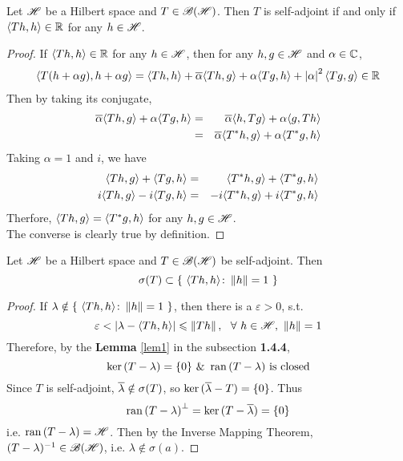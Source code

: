 \documentclass[a4paper,11pt]{report}
\begin{document}
\begin{prop}
	Let $\mathscr{H}$ be a Hilbert space and $T \in \mathscr{B(H)}$. Then $T$ is self-adjoint if and only if $\langle Th,h \rangle \in \mathbb{R}$ for any $h \in \mathscr{H}$.
\end{prop}
\begin{proof}
	If $\langle Th,h \rangle \in \mathbb{R}$ for any $h \in \mathscr{H}$, then for any $h,g \in \mathscr{H}$ and $\alpha \in \mathbb{C}$,
	\begin{eqnarray*}
		\langle T(h+\alpha g),h+\alpha g \rangle = \langle Th,h \rangle + \overline{\alpha}\langle Th,g \rangle + \alpha \langle Tg,h \rangle + \left\lvert\alpha\right\lvert^2 \langle Tg,g \rangle \in \mathbb{R}
	\end{eqnarray*}
	Then by taking its conjugate,
	\begin{eqnarray*}
		\overline{\alpha}\langle Th,g \rangle + \alpha \langle Tg,h \rangle &=& \overline{\alpha} \langle h,Tg \rangle + \alpha \langle g,Th \rangle \\
		&=& \overline{\alpha} \langle T^{*}h,g \rangle + \alpha \langle T^{*}g,h \rangle
	\end{eqnarray*}
	Taking $\alpha = 1$ and $i$, we have
	\begin{eqnarray*}
		\langle Th,g \rangle + \langle Tg,h \rangle &=& \langle T^{*}h,g \rangle + \langle T^{*}g,h \rangle \\
		i\langle Th,g \rangle - i\langle Tg,h \rangle &=& -i\langle T^{*}h,g \rangle + i\langle T^{*}g,h \rangle
	\end{eqnarray*}
	Therfore, $\langle Th,g \rangle=\langle T^{*}g,h \rangle$ for any $h,g \in \mathscr{H}$.\\
	The converse is clearly true by definition.
\end{proof}

\begin{prop} \label{prop9}
	Let $\mathscr{H}$ be a Hilbert space and $T \in \mathscr{B(H)}$ be self-adjoint. Then
	\begin{equation*}
		\sigma(T) \subset \{~\langle Th,h \rangle \colon \left\lVert h\right\lVert = 1~\}
	\end{equation*}
\end{prop}
\begin{proof}
	If $\lambda \notin \{~\langle Th,h \rangle \colon \left\lVert h\right\lVert = 1~\}$, then there is a $\varepsilon > 0$, s.t.
	\begin{equation*}
		\varepsilon < \left\lvert\lambda - \langle Th,h \rangle\right\lvert \leqslant \left\lVert Th\right\lVert,~~\forall~ h \in \mathscr{H},~\left\lVert h\right\lVert=1
	\end{equation*}
	Therefore, by the \textbf{Lemma} \ref{lem1} in the subsection \textbf{1.4.4},
	\begin{equation*}
		\ker{(T - \lambda)}=\{0\} ~\&~ \operatorname{ran}{(T - \lambda)} \text{ is closed}
	\end{equation*}
	Since $T$ is self-adjoint, $\overline{\lambda} \notin \sigma(T)$, so $\ker{(\overline{\lambda} - T)} = \{0\}$. Thus 
	\begin{equation*}
		\operatorname{ran}{(T - \lambda)}^{\bot} = \ker{(T - \overline{\lambda})} = \{0\}
	\end{equation*}
	i.e. $\operatorname{ran}{(T - \lambda)} = \mathscr{H}$. Then by the Inverse Mapping Theorem, $(T - \lambda)^{-1} \in \mathscr{B(H)}$, i.e. $\lambda \notin \sigma(a)$.
\end{proof}
\end{document}
